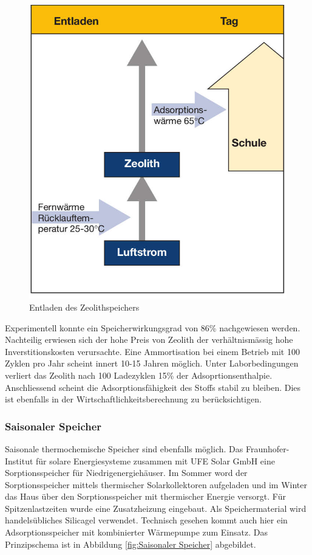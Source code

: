 \documentclass[11pt,a4paper]{scrartcl}
\begin{document}
\begin{figure}[h!]
\begin{center}
\includegraphics[scale=1]{images/Entladen.jpg}
\caption{Entladen des Zeolithspeichers \cite{BINE2}}
\label{fig:Entladen}
\end{center}
\end{figure}
Experimentell konnte ein Speicherwirkungsgrad von 86\% nachgewiesen werden.
Nachteilig erwiesen sich der hohe Preis von Zeolith der verhältnismässig hohe
Inverstitionskosten verursachte. Eine Ammortisation bei einem Betrieb mit 100
Zyklen pro Jahr scheint innert 10-15 Jahren möglich. Unter Laborbedingungen
verliert das Zeolith nach 100 Ladezyklen 15\% der Adsoprtionsenthalpie.
Anschliessend scheint die Adsorptionsfähigkeit des Stoffs stabil zu bleiben.
Dies ist ebenfalls in der Wirtschaftlichkeitsberechnung zu berücksichtigen.
\cite{BINE2}

\subsubsection{Saisonaler Speicher}
Saisonale thermochemische Speicher sind ebenfalls möglich. Das Fraunhofer-
Institut für solare Energiesysteme zusammen mit UFE Solar GmbH eine
Sorptionsspeicher für Niedrigenergiehäuser. Im Sommer word der Sorptionsspeicher
mittels thermischer Solarkollektoren aufgeladen und im Winter das Haus über den
Sorptionsspeicher mit thermischer Energie versorgt. Für Spitzenlastzeiten wurde
eine Zusatzheizung eingebaut. Als Speichermaterial wird handelsübliches
Silicagel verwendet. Technisch gesehen kommt auch hier ein Adsorptionsspeicher
mit kombinierter Wärmepumpe zum Einsatz. Das Prinzipschema ist in Abbildung \ref{fig:Saisonaler Speicher}
abgebildet.
\end{document}
